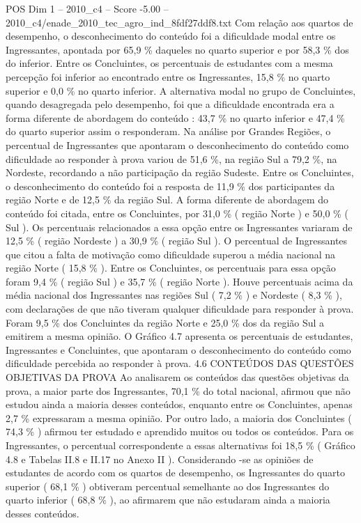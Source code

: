 \begin{textsample}{POS Dim 1 – 2010\_c4 – Score -5.00 – 2010\_c4/enade\_2010\_tec\_agro\_ind\_8fdf27ddf8.txt}
Com relação aos quartos de desempenho, o desconhecimento do conteúdo foi a dificuldade modal entre os Ingressantes, apontada por 65,9 \% daqueles no quarto superior e por 58,3 \% dos do inferior.
Entre os Concluintes, os percentuais de estudantes com a mesma percepção foi inferior ao encontrado entre os Ingressantes, 15,8 \% no quarto superior e 0,0 \% no quarto inferior.
A alternativa modal no grupo de Concluintes, quando desagregada pelo desempenho, foi que a dificuldade encontrada era a forma diferente de abordagem do conteúdo : 43,7 \% no quarto inferior e 47,4 \% do quarto superior assim o responderam.
Na análise por Grandes Regiões, o percentual de Ingressantes que apontaram o desconhecimento do conteúdo como dificuldade ao responder à prova variou de 51,6 \%, na região Sul a 79,2 \%, na Nordeste, recordando a não participação da região Sudeste.
Entre os Concluintes, o desconhecimento do conteúdo foi a resposta de 11,9 \% dos participantes da região Norte e de 12,5 \% da região Sul.
A forma diferente de abordagem do conteúdo foi citada, entre os Concluintes, por 31,0 \% ( região Norte ) e 50,0 \% ( Sul ).
Os percentuais relacionados a essa opção entre os Ingressantes variaram de 12,5 \% ( região Nordeste ) a 30,9 \% ( região Sul ).
O percentual de Ingressantes que citou a falta de motivação como dificuldade superou a média nacional na região Norte ( 15,8 \% ).
Entre os Concluintes, os percentuais para essa opção foram 9,4 \% ( região Sul ) e 35,7 \% ( região Norte ).
Houve percentuais acima da média nacional dos Ingressantes nas regiões Sul ( 7,2 \% ) e Nordeste ( 8,3 \% ), com declarações de que não tiveram qualquer dificuldade para responder à prova.
Foram 9,5 \% dos Concluintes da região Norte e 25,0 \% dos da região Sul a emitirem a mesma opinião.
O Gráfico 4.7 apresenta os percentuais de estudantes, Ingressantes e Concluintes, que apontaram o desconhecimento do conteúdo como dificuldade percebida ao responder à prova. 4.6 CONTEÚDOS DAS QUESTÕES OBJETIVAS DA PROVA Ao analisarem os conteúdos das questões objetivas da prova, a maior parte dos Ingressantes, 70,1 \% do total nacional, afirmou que não estudou ainda a maioria desses conteúdos, enquanto entre os Concluintes, apenas 2,7 \% expressaram a mesma opinião.
Por outro lado, a maioria dos Concluintes ( 74,3 \% ) afirmou ter estudado e aprendido muitos ou todos os conteúdos.
Para os Ingressantes, o percentual correspondente a essas alternativas foi 18,5 \% ( Gráfico 4.8 e Tabelas II.8 e II.17 no Anexo II ).
Considerando -se as opiniões de estudantes de acordo com os quartos de desempenho, os Ingressantes do quarto superior ( 68,1 \% ) obtiveram percentual semelhante ao dos Ingressantes do quarto inferior ( 68,8 \% ), ao afirmarem que não estudaram ainda a maioria desses conteúdos.

\end{textsample}
